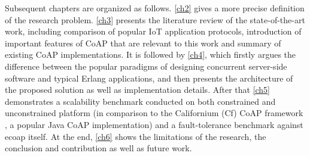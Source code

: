 Subsequent chapters are organized as follows. \autoref{ch2} gives a more precise definition of the research problem. \autoref{ch3} presents the literature review of the state-of-the-art work, including comparison of popular IoT application protocols, introduction of important features of CoAP that are relevant to this work and summary of existing CoAP implementations. It is followed by \autoref{ch4}, which firstly argues the difference between the popular paradigms of designing concurrent server-side software and typical Erlang applications, and then presents the architecture of the proposed solution as well as implementation details. After that \autoref{ch5} demonstrates a scalability benchmark conducted on both constrained and unconstrained platform (in comparison to the Californium (Cf) CoAP framework \autocite{californium}, a popular Java CoAP implementation) and a fault-tolerance benchmark against ecoap itself. At the end, \autoref{ch6} shows the limitations of the research, the conclusion and contribution as well as future work.





